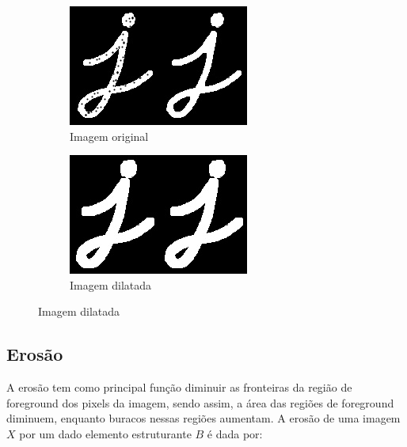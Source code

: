 \documentclass[10pt,a4paper]{article}
\begin{document}
\begin{figure}[!ht]
    \centering
    \begin{subfigure}[ht]{0.45\textwidth}
        \includegraphics[width=\textwidth]{src.jpg}
        \caption{Imagem original}
    \end{subfigure}
    \qquad
    \begin{subfigure}[ht]{0.45\textwidth}
        \includegraphics[width=\textwidth]{dilation.jpg}
        \caption{Imagem dilatada}
    \end{subfigure}
    \label{fig:dilation}
\end{figure}

\subsection{Erosão}
A erosão tem como principal função diminuir as fronteiras da região de foreground dos pixels da imagem, sendo assim, a área das regiões de foreground diminuem, enquanto buracos nessas regiões aumentam. A erosão de uma imagem $X$ por um dado elemento estruturante $B$ é dada por:
\end{document}
